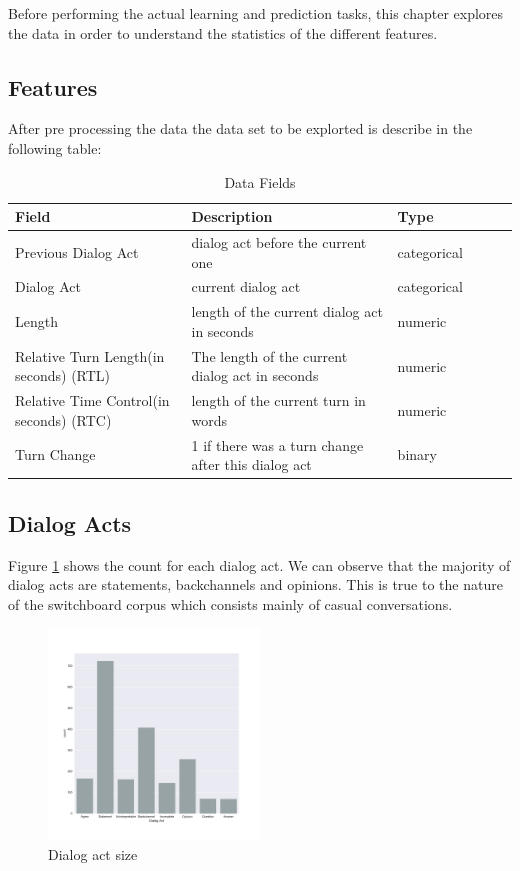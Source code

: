 Before performing the actual learning and prediction tasks, this chapter explores the data
in order to understand the statistics of the different features.

\subsection{Features}

After pre processing the data the data set to be explorted is describe in the following table:

\begin{table}[ht!]
\begin{center}
\begin{tabular}{llllrr}
\toprule
Field &  Description & Type &\\
\midrule
     Previous Dialog Act & dialog act before the current one  & categorical\\
     Dialog Act & current dialog act & categorical \\
     Length & length of the current dialog act in seconds & numeric \\
     Relative Turn Length(in seconds) (RTL)  & The length of the current dialog act in seconds & numeric \\
     Relative Time Control(in seconds) (RTC) & length of the current turn in words & numeric \\
     Turn Change & 1 if there was a turn change after this dialog act & binary \\
\bottomrule
\end{tabular}
\end{center}
\caption{Data Fields}
\end{table}


\subsection{Dialog Acts}

Figure \ref{dactsizefig} shows the count for each dialog act. We can observe that the majority of dialog acts are statements, backchannels and opinions. This is true to the nature of the switchboard corpus
which consists mainly of casual conversations. 

 \begin{figure}[ht!]
 \centering
 \includegraphics[width=0.5\textwidth]{../scikitlearn/figures/countplot_da_name_count.pdf}
 \caption{Dialog act size\label{overflow}}
 \label{dactsizefig}
 \end{figure}

